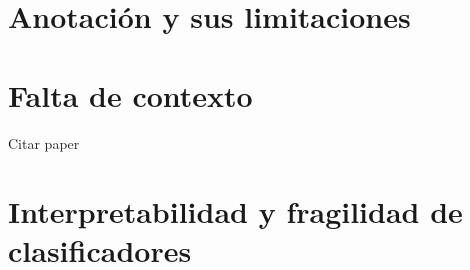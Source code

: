 \section{Anotación y sus limitaciones}

\section{Falta de contexto}

Citar paper

\section{Interpretabilidad y fragilidad de clasificadores}
